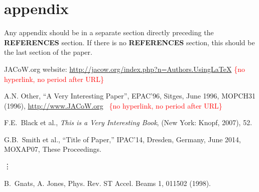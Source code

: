 \documentclass[acus,%
              ]{jacow}
\newcommand\SEC[1]{\textbf{\uppercase{#1}}}
\begin{document}
\section{appendix}
Any appendix should be in a separate section directly preceding
the \SEC{References} section. If there is no \SEC{References} section,
this should be the last section of the paper.

\iffalse  %
	\newpage
	\printbibliography

\else

\begin{thebibliography}{99} %


	JACoW.org website:
	\url{http://jacow.org/index.php?n=Authors.UsingLaTeX}%
	\hfill\textcolor{red}{\{no hyperlink, no period after URL\}}

	A.N. Other,
	``A Very Interesting Paper'',
	EPAC'96, Sitges, June 1996, MOPCH31 (1996),
	\url{http://www.JACoW.org}\newline \mbox{ } \hfill\textcolor{red}{\{no hyperlink, no period after URL\}}

	F.E.~Black et al.,
	\textit{This is a Very Interesting Book},
	(New York: Knopf, 2007), 52.

    G.B.~Smith et al., ``Title of Paper,''
    IPAC'14, Dresden, Germany,
    June 2014, MOXAP07, These Proceedings.

	\hspace*{-1.1em}\mbox{\vdots}

\addtocounter{enumi}{5}
	B.~Gnats, A. Jones,
	Phys. Rev. ST Accel. Beams 1, 011502 (1998).

\end{thebibliography}

\fi
\end{document}
